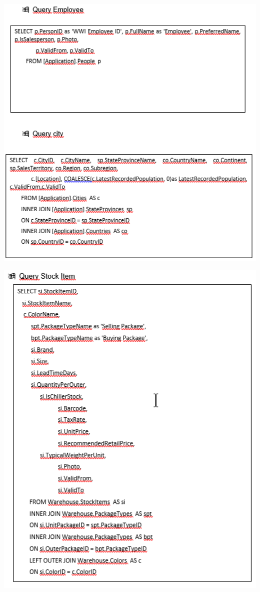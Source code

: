 \documentclass[12pt,letterpaper]{article}
\begin{document}
\begin{center}
\includegraphics[width=17cm]{IMG/17.png} 
\end{center}

\begin{center}
\includegraphics[width=17cm]{IMG/18.png} 
\end{center}
\end{document}
